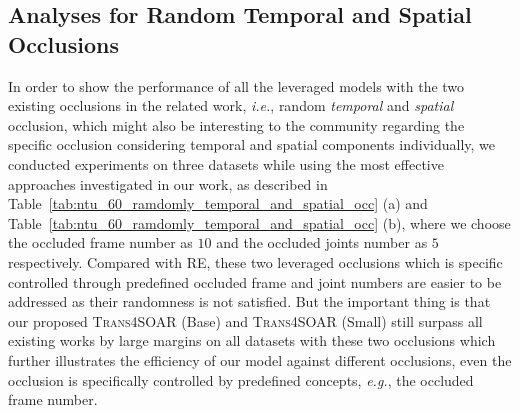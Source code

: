 \documentclass[lettersize,journal]{IEEEtran}
\begin{document}
\subsection{Analyses for Random Temporal and Spatial Occlusions}
In order to show the performance of all the leveraged models with the two existing occlusions in the related work, \textit{i.e.}, random \emph{temporal} and \emph{spatial} occlusion, which might also be interesting to the community regarding the specific occlusion considering temporal and spatial components individually, we conducted experiments on three datasets while using the most effective approaches investigated in our work, as described in Table~\ref{tab:ntu_60_ramdomly_temporal_and_spatial_occ} (a) and Table~\ref{tab:ntu_60_ramdomly_temporal_and_spatial_occ} (b), where we choose the occluded frame number as $10$ and the occluded joints number as $5$ respectively. Compared with RE, these two leveraged occlusions which is specific controlled through predefined occluded frame and joint numbers are easier to be addressed as their randomness is not satisfied. But the important thing is that our proposed \textsc{Trans4SOAR} (Base) and \textsc{Trans4SOAR} (Small) still surpass all existing works by large margins on all datasets with these two occlusions which further illustrates the efficiency of our model against different occlusions, even the occlusion is specifically controlled by predefined concepts, \textit{e.g.}, the occluded frame number.
\end{document}
